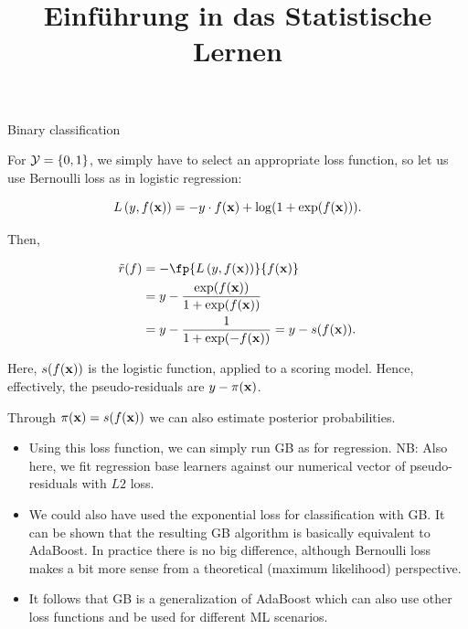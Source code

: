 






\newcommand{\titlefigure}{figure/boosting_classif_title.png}
\newcommand{\learninggoals}{
  \item Transfering gradient boosting for regression to binary classification problems
  \item Introducing gradient boosting for multiclass problems
}

\title{Einführung in das Statistische Lernen}
\date{}





\begin{vbframe}{Binary classification}


For $\mathcal{Y} = \{0, 1\}$, we simply have to select an appropriate loss function, so let us
use Bernoulli loss as in logistic regression:

$$ L\left(y, f(\mathbf{x})\right) = - y \cdot f(\mathbf{x}) + \log(1 + \exp(f(\mathbf{x}))).$$

Then,

\vspace{-0.5cm}

\begin{align*}
\tilde{r}(f) &=-\fp{\Lxy}{\fx} \\
&= y - \frac{\exp(\fx)}{1 + \exp(\fx)} \\
&= y - \frac{1}{1 + \exp(-\fx)} = y - s(\fx).
\end{align*}

Here, $s(f(\mathbf{x}))$ is the logistic function, applied to a scoring model.
Hence, effectively, the pseudo-residuals are $y - \pi(\mathbf{x})$.

Through $\pi(\mathbf{x}) = s(f(\mathbf{x}))$ we can also estimate posterior probabilities.

\framebreak
%

\begin{itemize}
\item Using this loss function, we can simply run GB as for regression.
  NB: Also here, we fit regression base learners against our numerical
  vector of pseudo-residuals with $L2$ loss.
\item  We could also have used the exponential loss for classification with
  GB. It can be shown that the resulting GB algorithm is basically equivalent
    to AdaBoost. In practice there is no big difference, although Bernoulli loss
    makes a bit more sense from a theoretical (maximum likelihood) perspective.
\item It follows that GB is a generalization of AdaBoost which can also use other loss functions and be used for different ML scenarios.
\end{itemize}


\end{vbframe}

